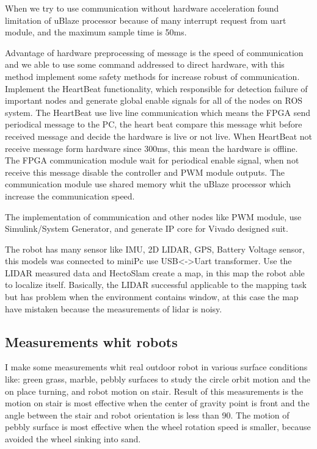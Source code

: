 \begin{titlepage}
When we try to use communication without hardware acceleration found limitation of uBlaze processor because of many interrupt request from uart module, and the maximum sample time is 50ms.

Advantage of hardware preprocessing of message is the speed of communication and we able to use some command addressed to direct hardware, with this method implement some safety methods for increase robust of communication. Implement the HeartBeat functionality, which 
responsible for detection failure of important nodes and generate global enable signals for all of the nodes on ROS system. The HeartBeat use live line communication which means the FPGA send periodical message to the PC, the heart beat compare this message whit before received message and decide the hardware is live or not live. When HeartBeat not receive message form hardware since 300ms, this mean the hardware is offline. The FPGA communication module wait for periodical enable signal, when not receive this message disable the controller and PWM module outputs.
The communication module use shared memory whit the uBlaze processor which increase the communication speed.

The implementation of communication and other nodes like PWM module, use Simulink/System Generator, and generate IP core for Vivado designed suit.

The robot has many sensor like IMU, 2D LIDAR, GPS, Battery Voltage sensor, this models was connected to miniPc use USB<->Uart transformer. Use the LIDAR measured data and HectoSlam create a map, in this map the robot able to localize itself. Basically, the LIDAR successful applicable to the mapping task but has problem when the environment contains window, at this case the map have mistaken because the measurements of lidar is noisy.

\subsection{Measurements whit robots}

I make some measurements whit real outdoor robot in various surface conditions like: green grass, marble, pebbly surfaces to study the circle orbit motion and the on place turning, and robot motion on stair. Result of this measurements is the motion on stair is most effective when the center of gravity point is front and the angle between the stair and robot orientation is less than 90\degree. The motion of pebbly surface is most effective when the wheel rotation speed is smaller, because avoided the wheel sinking into sand.


\end{titlepage}
